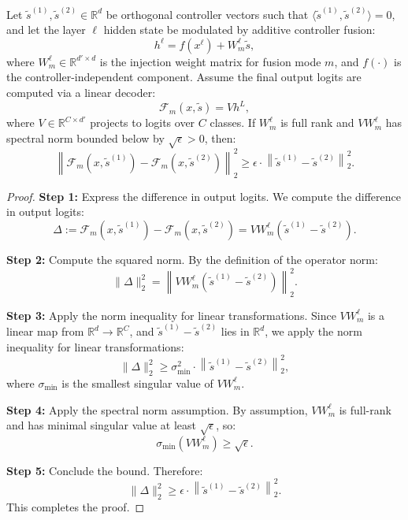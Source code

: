 \begin{proposition}
\label{prop:orthogonal_fusion}
Let \(\tilde{s}^{(1)}, \tilde{s}^{(2)} \in \mathbb{R}^d\) be orthogonal controller vectors such that \(\langle \tilde{s}^{(1)}, \tilde{s}^{(2)} \rangle = 0\), and let the layer \(\ell\) hidden state be modulated by additive controller fusion:
\[
h^\ell = f(x^\ell) + W_m^\ell \tilde{s},
\]
where \(W_m^\ell \in \mathbb{R}^{d' \times d}\) is the injection weight matrix for fusion mode \(m\), and \(f(\cdot)\) is the controller-independent component. Assume the final output logits are computed via a linear decoder:
\[
\mathcal{F}_m(x, \tilde{s}) = V h^L,
\]
where \(V \in \mathbb{R}^{C \times d'}\) projects to logits over \(C\) classes. If \(W_m^\ell\) is full rank and \(V W_m^\ell\) has spectral norm bounded below by \(\sqrt{\epsilon} > 0\), then:
\[
\left\| \mathcal{F}_m(x, \tilde{s}^{(1)}) - \mathcal{F}_m(x, \tilde{s}^{(2)}) \right\|_2^2 \geq \epsilon \cdot \left\| \tilde{s}^{(1)} - \tilde{s}^{(2)} \right\|_2^2.
\]
\end{proposition}

\begin{proof}
\textbf{Step 1:} Express the difference in output logits.
We compute the difference in output logits:
\[
\Delta := \mathcal{F}_m(x, \tilde{s}^{(1)}) - \mathcal{F}_m(x, \tilde{s}^{(2)}) = V W_m^\ell (\tilde{s}^{(1)} - \tilde{s}^{(2)}).
\]

\textbf{Step 2:} Compute the squared norm.
By the definition of the operator norm:
\[
\|\Delta\|_2^2 = \left\| V W_m^\ell (\tilde{s}^{(1)} - \tilde{s}^{(2)}) \right\|_2^2.
\]

\textbf{Step 3:} Apply the norm inequality for linear transformations.
Since \(V W_m^\ell\) is a linear map from \(\mathbb{R}^d \to \mathbb{R}^C\), and \(\tilde{s}^{(1)} - \tilde{s}^{(2)}\) lies in \(\mathbb{R}^d\), we apply the norm inequality for linear transformations:
\[
\| \Delta \|_2^2 \geq \sigma_{\min}^2 \cdot \left\| \tilde{s}^{(1)} - \tilde{s}^{(2)} \right\|_2^2,
\]
where \(\sigma_{\min}\) is the smallest singular value of \(V W_m^\ell\).

\textbf{Step 4:} Apply the spectral norm assumption.
By assumption, \(V W_m^\ell\) is full-rank and has minimal singular value at least \(\sqrt{\epsilon}\), so:
\[
\sigma_{\min}(V W_m^\ell) \geq \sqrt{\epsilon}.
\]

\textbf{Step 5:} Conclude the bound.
Therefore:
\[
\| \Delta \|_2^2 \geq \epsilon \cdot \left\| \tilde{s}^{(1)} - \tilde{s}^{(2)} \right\|_2^2.
\]
This completes the proof.
\end{proof}
